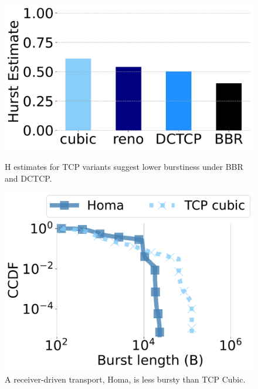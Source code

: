 \begin{figure}[t]
\begin{minipage}[b]{0.49\textwidth}
    \centering
    	\includegraphics[width=1\linewidth]{figs/transport_hurst_bar.pdf}
    \caption{\small{H estimates for TCP variants suggest lower burstiness under BBR and DCTCP.}}
	\label{fig:transport-hurst}
     \vspace{-2mm}
\end{minipage}
\hspace{2pt}
\begin{minipage}[b]{0.45\textwidth}
    \centering
    	\includegraphics[width=1\linewidth]{figs/homa_ccdf.pdf}
    \caption{\small{A receiver-driven transport, Homa, is less bursty than TCP Cubic.}}
	\label{fig:transport-homa}
     \vspace{-2mm}
     \end{minipage}
\end{figure}



